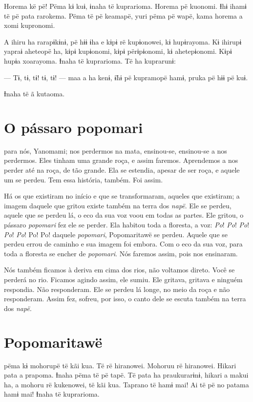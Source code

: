 Horema kë pë! Pëma kɨ kuɨ, ɨnaha të kuprarioma. Horema pë kuonomi. Ɨhɨ
ihamɨ të pë pata rarokema. Pëma të pë keamapë, yuri pëma pë wapë, kama
horema a xomi kupronomi. 

A ihiru ha rarapɨkɨnɨ, pë hɨɨ ɨha e kɨpɨ rë kupɨonowei, kɨ hupɨrayoma.
Kɨ ihirupɨ yapraɨ aheteopë ha, kɨpɨ kupɨonomi, kɨpɨ përɨpɨonomi, kɨ
ahetepɨonomi. Kɨpɨ hupɨa xoarayoma. Ɨnaha të kuprarioma. Të ha
kuprarunɨ: 

--- Tɨ, tɨ, tɨ! tɨ, tɨ! --- maa a ha kenɨ, ɨ̃hɨ pë kupramopë hamɨ, pruka
pë hɨɨ pë kuɨ. 

Ɨnaha të ã kutaoma.

\chapter{O pássaro popomari}

 para nós, Yanomami; nos perdermos na mata, ensinou-se,
ensinou-se a nos perdermos. Eles tinham uma grande roça, e assim faremos.
Aprendemos a nos perder até na roça, de tão grande. Ela se estendia, apesar
de ser roça, e aquele um se perdeu. Tem essa história, também. Foi assim. 

Há os que existiram no início e que se transformaram, aqueles que
existiram; a imagem daquele que gritou existe também na terra
dos \textit{napë}. Ele se perdeu, aquele que se perdeu lá, o eco da sua
voz voou em todas as partes. Ele gritou, o pássaro \textit{popomari} fez
ele se perder. Ela habitou toda a floresta, a voz: \textit{Po}! \textit{Po}! \textit{Po}! \textit{Po}! \textit{Po}!
Po! Po! daquele \textit{popomari}, Popomaritawë se perdeu. Aquele que se
perdeu errou de caminho e sua imagem foi embora. Com o eco da sua voz,
para toda a floresta se encher de \textit{popomari}. Nós faremos assim,
pois nos ensinaram. 

Nós também ficamos à deriva em cima dos rios, não voltamos direto. Você se
perderá no rio. Ficamos agindo assim, ele sumiu. Ele gritava, gritava e
ninguém respondia. Não responderam. Ele se perdeu lá longe, no meio da
roça e não responderam. Assim fez, sofreu, por isso, o canto dele se
escuta também na terra dos \textit{napë}.

\chapter{Popomaritawë}
 
 pëma kɨ mohorupë të kãi kua. Të rë hiranowei. Mohoruu rë
hiranowei. Hikari pata a prapoma. Ɨnaha pëma të pë tapë. Të pata ha
praukurarɨnɨ, hikari a makui ha, a mohoru rë kukenowei, të kãi kua.
Taprano të hamɨ mai! Ai të pë no patama hamɨ mai! Ɨnaha të kuprarioma. 


